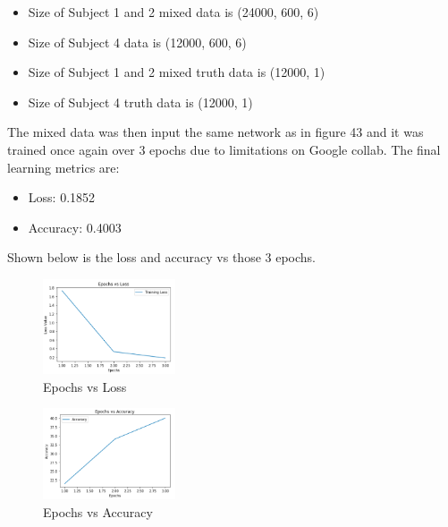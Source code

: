 \documentclass[conference]{IEEEtran}
\begin{document}
    \begin{itemize}
        \item Size of Subject 1 and 2 mixed data is (24000, 600, 6)
        \item Size of Subject 4 data is (12000, 600, 6)
        \item Size of Subject 1 and 2 mixed truth data is (12000, 1)
        \item Size of Subject 4 truth data is (12000, 1)
    \end{itemize} 

    The mixed data was then input the same network as in figure 43 and it was trained once again over 3 epochs due to limitations on Google
    collab. The final learning metrics are:

    \begin{itemize}
        \item Loss: 0.1852
        \item Accuracy: 0.4003
    \end{itemize}

    Shown below is the loss and accuracy vs those 3 epochs.
    
    \begin{figure}[H]
        \centering
        \captionsetup{justification=centering}
        \centering
            \includegraphics[width=0.35\textwidth]{46.png}
            \caption{Epochs vs Loss}
    \end{figure}

    \begin{figure}[H]
        \centering
        \captionsetup{justification=centering}
        \centering
            \includegraphics[width=0.35\textwidth]{47.png}
            \caption{Epochs vs Accuracy}
    \end{figure}
\end{document}
